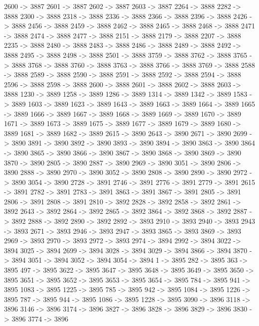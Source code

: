 {	2600 -> 3887
	2601 -> 3887
	2602 -> 3887
	2603 -> 3887
	2264 -> 3888
	2282 -> 3888
	2300 -> 3888
	2318 -> 3888
	2336 -> 3888
	2366 -> 3888
	2396 -> 3888
	2426 -> 3888
	2456 -> 3888
	2459 -> 3888
	2462 -> 3888
	2465 -> 3888
	2468 -> 3888
	2471 -> 3888
	2474 -> 3888
	2477 -> 3888
	2151 -> 3888
	2179 -> 3888
	2207 -> 3888
	2235 -> 3888
	2480 -> 3888
	2483 -> 3888
	2486 -> 3888
	2489 -> 3888
	2492 -> 3888
	2495 -> 3888
	2498 -> 3888
	2501 -> 3888
	3759 -> 3888
	3762 -> 3888
	3765 -> 3888
	3768 -> 3888
	3760 -> 3888
	3763 -> 3888
	3766 -> 3888
	3769 -> 3888
	2588 -> 3888
	2589 -> 3888
	2590 -> 3888
	2591 -> 3888
	2592 -> 3888
	2594 -> 3888
	2596 -> 3888
	2598 -> 3888
	2600 -> 3888
	2601 -> 3888
	2602 -> 3888
	2603 -> 3888
	1230 -> 3889
	1258 -> 3889
	1286 -> 3889
	1314 -> 3889
	1342 -> 3889
	1583 -> 3889
	1603 -> 3889
	1623 -> 3889
	1643 -> 3889
	1663 -> 3889
	1664 -> 3889
	1665 -> 3889
	1666 -> 3889
	1667 -> 3889
	1668 -> 3889
	1669 -> 3889
	1670 -> 3889
	1671 -> 3889
	1673 -> 3889
	1675 -> 3889
	1677 -> 3889
	1679 -> 3889
	1680 -> 3889
	1681 -> 3889
	1682 -> 3889
	2615 -> 3890
	2643 -> 3890
	2671 -> 3890
	2699 -> 3890
	3891 -> 3890
	3892 -> 3890
	3893 -> 3890
	3894 -> 3890
	3863 -> 3890
	3864 -> 3890
	3865 -> 3890
	3866 -> 3890
	3867 -> 3890
	3868 -> 3890
	3869 -> 3890
	3870 -> 3890
	2805 -> 3890
	2887 -> 3890
	2969 -> 3890
	3051 -> 3890
	2806 -> 3890
	2888 -> 3890
	2970 -> 3890
	3052 -> 3890
	2808 -> 3890
	2890 -> 3890
	2972 -> 3890
	3054 -> 3890
	2728 -> 3891
	2746 -> 3891
	2776 -> 3891
	2779 -> 3891
	2615 -> 3891
	2782 -> 3891
	2783 -> 3891
	3863 -> 3891
	3867 -> 3891
	2805 -> 3891
	2806 -> 3891
	2808 -> 3891
	2810 -> 3892
	2828 -> 3892
	2858 -> 3892
	2861 -> 3892
	2643 -> 3892
	2864 -> 3892
	2865 -> 3892
	3864 -> 3892
	3868 -> 3892
	2887 -> 3892
	2888 -> 3892
	2890 -> 3892
	2892 -> 3893
	2910 -> 3893
	2940 -> 3893
	2943 -> 3893
	2671 -> 3893
	2946 -> 3893
	2947 -> 3893
	3865 -> 3893
	3869 -> 3893
	2969 -> 3893
	2970 -> 3893
	2972 -> 3893
	2974 -> 3894
	2992 -> 3894
	3022 -> 3894
	3025 -> 3894
	2699 -> 3894
	3028 -> 3894
	3029 -> 3894
	3866 -> 3894
	3870 -> 3894
	3051 -> 3894
	3052 -> 3894
	3054 -> 3894
	1 -> 3895
	282 -> 3895
	363 -> 3895
	497 -> 3895
	3622 -> 3895
	3647 -> 3895
	3648 -> 3895
	3649 -> 3895
	3650 -> 3895
	3651 -> 3895
	3652 -> 3895
	3653 -> 3895
	3654 -> 3895
	784 -> 3895
	941 -> 3895
	1083 -> 3895
	1225 -> 3895
	785 -> 3895
	942 -> 3895
	1084 -> 3895
	1226 -> 3895
	787 -> 3895
	944 -> 3895
	1086 -> 3895
	1228 -> 3895
	3090 -> 3896
	3118 -> 3896
	3146 -> 3896
	3174 -> 3896
	3827 -> 3896
	3828 -> 3896
	3829 -> 3896
	3830 -> 3896
	3774 -> 3896
}
